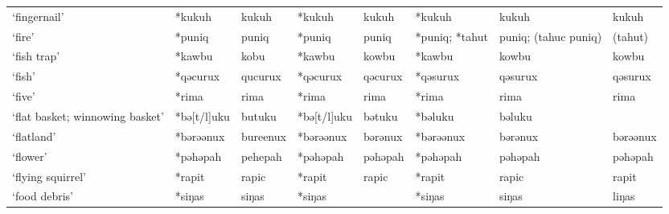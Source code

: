 \begin{landscape}
\begin{longtable}[c]{@{}p{3cm}<{\raggedright}p{2.75cm}<{\raggedright}p{2.75cm}<{\raggedright}p{2.75cm}<{\raggedright}p{2.75cm}<{\raggedright}p{2.75cm}<{\raggedright}p{2.75cm}<{\raggedright}p{2.75cm}<{\raggedright}@{}}
`fingernail'                                         & *kukuh       & kukuh                         & *kukuh         & kukuh                      & *kukuh           & kukuh                    & kukuh                             \\
`fire'                                               & *puniq       & puniq                         & *puniq         & puniq                      & *puniq; *tahut   & puniq; (tahuc puniq)     & (tahut)                           \\
`fish trap'                                          & *kawbu       & kobu                          & *kawbu         & kowbu                      & *kawbu           & kowbu                    & kowbu                             \\
`fish'                                               & *qəcurux     & qucurux                       & *qəcurux       & qəcurux                    & *qəsurux         & qəsurux                  & qəsurux                           \\
`five'                                               & *rima        & rima                          & *rima          & rima                       & *rima            & rima                     & rima                              \\
`flat basket; winnowing basket'                      & *bə[t/l]uku      & butuku                        & *bə[t/l]uku    & bətuku                     & *bəluku      & bəluku                   &                                   \\
`flatland'                                           & *bərəənux    & bureenux                      & *bərəənux      & bərənux                    & *bərəənux        & bərənux                  & bərəənux                          \\
`flower'                                             & *pəhəpah     & pehepah                       & *pəhəpah       & pəhəpah                    & *pəhəpah         & pəhəpah                  & pəhəpah                           \\
`flying squirrel'                                    & *rapit       & rapic                         & *rapit         & rapic                      & *rapit           & rapic                    & rapit                             \\
`food debris'                                        & *siŋas       & siŋas                         & *siŋas         &                            & *siŋas           & siŋas                    & liŋas                             \\

\end{longtable}
\end{landscape}

